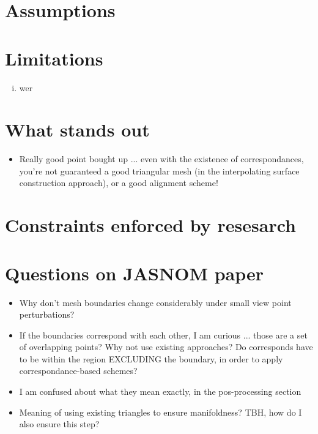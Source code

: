 \documentclass{article}
\begin{document}
\section{Assumptions}

\section{Limitations}
\begin{enumerate}[(i)]
	\item wer
\end{enumerate}

\section{What stands out}
\begin{itemize}
	\item Really good point bought up ... even with the existence of correspondances, you're not guaranteed a good triangular mesh (in the interpolating surface construction approach), or a good alignment scheme!
\end{itemize}

\section{Constraints enforced by resesarch}
\begin{itemize}
\end{itemize}

\section{Questions on JASNOM paper}
\begin{itemize}
	\item Why don't mesh boundaries change considerably under small view point perturbations?
	\item If the boundaries correspond with each other, I am curious ... those are a set of overlapping points? Why not use existing approaches? Do corresponds have to be within the region EXCLUDING the boundary, in order to apply correspondance-based schemes?
	\item I am confused about what they mean exactly, in the pos-processing section
	\item Meaning of using existing triangles to ensure manifoldness? TBH, how do I also ensure this step? 
\end{itemize}
\end{document}
